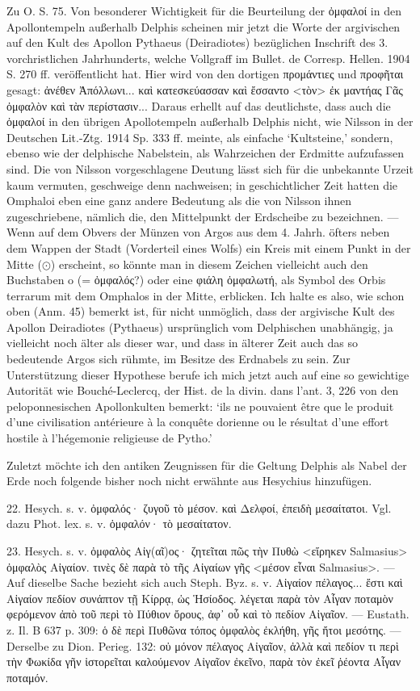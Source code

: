 \documentclass[a4paper, 11pt, oneside]{article}
\begin{document}
Zu O. S. 75. Von besonderer Wichtigkeit für die Beurteilung der ὀμφαλοί in den Apollontempeln außerhalb Delphis scheinen mir jetzt die Worte der argivischen auf den Kult des Apollon Pythaeus (Deiradiotes) bezüglichen Inschrift des 3. vorchristlichen Jahrhunderts, welche Vollgraff im Bullet. de Corresp. Hellen. 1904 S. 270 ff. veröffentlicht hat. Hier wird von den dortigen προμάντιες und προφῆται gesagt: ἀνέθεν Ἀπόλλωνι... καὶ κατεσκεύασσαν καὶ ἔσσαντο <τὸν> ἐκ μαντήας Γᾶς ὀμφαλὸν καὶ τὰν περίστασιν... Daraus erhellt auf das deutlichste, dass auch die ὀμφαλοί in den übrigen Apollotempeln außerhalb Delphis nicht, wie Nilsson in der Deutschen Lit.-Ztg. 1914 Sp. 333 ff. meinte, als einfache `Kultsteine,' sondern, ebenso wie der delphische Nabelstein, als Wahrzeichen der Erdmitte aufzufassen sind. Die von Nilsson vorgeschlagene Deutung lässt sich für die unbekannte Urzeit kaum vermuten, geschweige denn nachweisen; in geschichtlicher Zeit hatten die Omphaloi eben eine ganz andere Bedeutung als die von Nilsson ihnen zugeschriebene, nämlich die, den Mittelpunkt der Erdscheibe zu bezeichnen. --- Wenn auf dem Obvers der Münzen von Argos aus dem 4. Jahrh. öfters neben dem Wappen der Stadt (Vorderteil eines Wolfs) ein Kreis mit einem Punkt in der Mitte ($\odot$) erscheint, so könnte man in diesem Zeichen vielleicht auch den Buchstaben o (= ὀμφαλός?) oder eine φιάλη ὀμφαλωτή, als Symbol des Orbis terrarum mit dem Omphalos in der Mitte, erblicken. Ich halte es also, wie schon oben (Anm. 45) bemerkt ist, für nicht unmöglich, dass der argivische Kult des Apollon Deiradiotes (Pythaeus) ursprünglich vom Delphischen unabhängig, ja vielleicht noch älter als dieser war, und dass in älterer Zeit auch das so bedeutende Argos sich rühmte, im Besitze des Erdnabels zu sein. Zur Unterstützung dieser Hypothese berufe ich mich jetzt auch auf eine so gewichtige Autorität wie Bouché-Leclercq, der Hist. de la divin. dans l'ant. 3, 226 von den peloponnesischen Apollonkulten bemerkt: `ils ne pouvaient être que le produit d'une civilisation antérieure à la conquête dorienne ou le résultat d'une effort hostile à l'hégemonie religieuse de Pytho.'

Zuletzt möchte ich den antiken Zeugnissen für die Geltung Delphis als Nabel der Erde noch folgende bisher noch nicht erwähnte aus Hesychius hinzufügen.

22. Hesych. s. v. ὀμφαλός· ζυγοῦ τὸ μέσον. καὶ Δελφοί, ἐπειδὴ μεσαίτατοι. Vgl. dazu Phot. lex. s. v. ὀμφαλόν· τὸ μεσαίτατον.

23. Hesych. s. v. ὀμφαλὸς Αἰγ(αῖ)ος· ζητεῖται πῶς τὴν Πυθὼ <εἵρηκεν Salmasius> ὀμφαλὸς Αἰγαίον. τινὲς δὲ παρὰ τὸ τῆς Αἰγαίων γῆς <μέσον εἶναι Salmasius>. --- Auf dieselbe Sache bezieht sich auch Steph. Byz. s. v. Αἰγαίον πέλαγος... ἔστι καὶ Αἰγαίον πεδίον συνάπτον τῇ Κίρρᾳ, ὡς Ἡσίοδος. λέγεται παρὰ τὸν Αἶγαν ποταμὸν φερόμενον ἀπὸ τοῦ περὶ τὸ Πύθιον ὄρους, ἀφ᾽ οὗ καὶ τὸ πεδίον Αἰγαῖον. --- Eustath. z. Il. B 637 p. 309: ὁ δὲ περὶ Πυθῶνα τόπος ὀμφαλὸς ἐκλήθη, γῆς ἤτοι μεσότης. --- Derselbe zu Dion. Perieg. 132: οὐ μόνον πέλαγος Αἰγαῖον, ἀλλὰ καὶ πεδίον τι περὶ τὴν Φωκίδα γῆν ἱστορεῖται καλούμενον Αἰγαῖον ἐκεῖνο, παρὰ τὸν ἐκεῖ ῥέοντα Αἶγαν ποταμόν.
\end{document}
